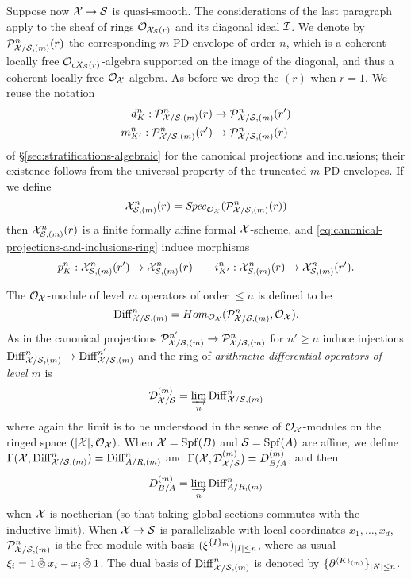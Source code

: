 \documentclass{article}
\theoremstyle{change}
\numberwithin{equation}{subsubsection}
\begin{document}
Suppose now ${\cal X}\to{\cal S}$ is quasi-smooth.  The considerations of the
last paragraph apply to the sheaf of rings ${\cal O}_{{\cal X}_{\cal S}(r)}$ and its
diagonal ideal ${\cal I}$. We denote by ${\cal P}^n_{{\cal X}/{\cal S},(m)}(r)$ the
corresponding $m$-PD-envelope of order $n$, which is a coherent
locally free ${\cal O}_{cX_{\cal S}(r)}$-algebra supported on the image of the
diagonal, and thus a coherent locally free ${\cal O}_{\cal X}$-algebra. As before
we drop the $(r)$ when $r=1$. We reuse the notation
\begin{equation}
  \label{eq:canonical-projections-and-inclusions-ring}
  \begin{split}
    d^n_K:{\cal P}^n_{{\cal X}/{\cal S},(m)}(r)&\to{\cal P}^n_{{\cal X}/{\cal S},(m)}(r')\\
    m^n_{K'}:{\cal P}^n_{{\cal X}/{\cal S},(m)}(r')&\to{\cal P}^n_{{\cal X}/{\cal S},(m)}(r)
  \end{split}
\end{equation}
of \S\ref{sec:stratifications-algebraic} for the canonical projections
and inclusions; their existence follows from the universal property of
the truncated $m$-PD-envelopes. If we define
\begin{equation}
  \label{eq:level-m-diagonal-order-n}
  {\cal X}^n_{{\cal S},(m)}(r)={\mathit{Spec}_{{\cal O}_{\cal X}}({{\cal P}^n_{{\cal X}/{\cal S},(m)}(r)})}
\end{equation}
then ${\cal X}^n_{{\cal S},(m)}(r)$ is a finite formally affine formal
${\cal X}$-scheme, and \ref{eq:canonical-projections-and-inclusions-ring}
induce morphisms 
\begin{equation}
  \label{eq:canonical-projections-and-inclusions}
  p^n_K:{\cal X}_{{\cal S},(m)}^n(r')\to{\cal X}_{{\cal S},(m)}^n(r)
  \qquad
  i^n_{K'}:{\cal X}_{{\cal S},(m)}^n(r)\to{\cal X}_{{\cal S},(m)}^n(r').
\end{equation}

The ${\cal O}_{\cal X}$-module of level $m$ operators of order $\le n$ is defined
to be
\begin{displaymath}
  {\operatorname{Diff}}^n_{{\cal X}/{\cal S},(m)}=Hom_{{\cal O}_{\cal X}}({\cal P}^n_{{\cal X}/{\cal S},(m)},{\cal O}_{\cal X}).
\end{displaymath}
As in \cite[\S2.2]{berthelot:1990} the canonical projections
${\cal P}^{n'}_{{\cal X}/{\cal S},(m)}\to{\cal P}^n_{{\cal X}/{\cal S},(m)}$ for
$n'\ge n$ induce injections
${\operatorname{Diff}}^n_{{\cal X}/{\cal S},(m)}\to{\operatorname{Diff}}^{n'}_{{\cal X}/{\cal S},(m)}$ and the ring of
\textit{arithmetic differential operators of level $m$} is
\begin{displaymath}
  {{\cal D}}^{({m})}_{{\cal X}/{\cal S}}=\varinjlim_n{\operatorname{Diff}}^n_{{\cal X}/{\cal S},(m)}
\end{displaymath}
where again the limit is to be understood in the sense of
${\cal O}_{\cal X}$-modules on the ringed space $(|{\cal X}|,{\cal O}_{\cal X})$. When
${\cal X}={\operatorname{Spf}({B})}$ and ${\cal S}={\operatorname{Spf}({A})}$ are affine, we define
$\Gamma({\cal X},{\operatorname{Diff}}^n_{{\cal X}/{\cal S},(m)})={\operatorname{Diff}}^n_{A/R,(m)}$ and
$\Gamma({\cal X},{{\cal D}}^{({m})}_{{\cal X}/{\cal S}})={D}^{({m})}_{B/A}$, and then
\begin{displaymath}
  {D}^{({m})}_{B/A}=\varinjlim_n{\operatorname{Diff}}^n_{A/R,(m)}
\end{displaymath}
when ${\cal X}$ is noetherian (so that taking global sections commutes with
the inductive limit). When ${\cal X}\to{\cal S}$ is parallelizable with local
coordinates $x_1,\ldots,x_d$, ${\cal P}^n_{{\cal X}/{\cal S},(m)}$ is the free module
with basis $({\xi}^{\{{I}\}_{m}})_{|I|\le n}$, where as usual
$\xi_i=1\mathop{\hat\otimes} x_i-x_i\mathop{\hat\otimes}1$. The dual basis of
${\operatorname{Diff}}^n_{{\cal X}/{\cal S},(m)}$ is denoted by
$\{{{\partial}}^{\langle{K}\rangle_{(m)}}\}_{|K|\le n}$.
\end{document}
